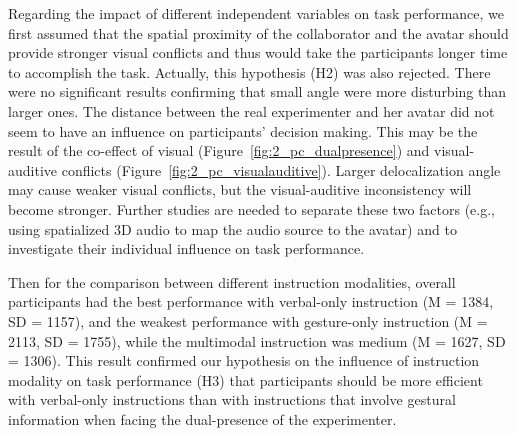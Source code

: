 Regarding the impact of different independent variables on task performance, we first assumed that the spatial proximity of the collaborator and the avatar should provide stronger visual conflicts and thus would take the participants longer time to accomplish the task. Actually, this hypothesis (H2) was also rejected. There were no significant results confirming that small angle were more disturbing than larger ones. The distance between the real experimenter and her avatar did not seem to have an influence on participants' decision making. This may be the result of the co-effect of visual (Figure~\ref{fig:2_pc_dualpresence}) and visual-auditive conflicts (Figure~\ref{fig:2_pc_visualauditive}). Larger delocalization angle may cause weaker visual conflicts, but the visual-auditive inconsistency will become stronger. Further studies are needed to separate these two factors (e.g., using spatialized 3D audio to map the audio source to the avatar) and to investigate their individual influence on task performance.

Then for the comparison between different instruction modalities, overall participants had the best performance with verbal-only instruction (M = 1384, SD = 1157), and the weakest performance with gesture-only instruction (M = 2113, SD = 1755), while the multimodal instruction was medium (M = 1627, SD = 1306). This result confirmed our hypothesis on the influence of instruction modality on task performance (H3) that participants should be more efficient with verbal-only instructions than with instructions that involve gestural information when facing the dual-presence of the experimenter.

